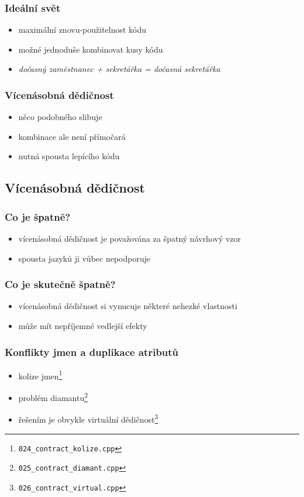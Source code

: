 	\begin{frame}
		\frametitle{Ideální svět}
		\begin{itemize}
			\item{maximální znovu-použitelnost kódu}
			\item{možné jednoduše kombinovat kusy kódu}
			\item{\textit{dočasný zaměstnanec + sekretářka = dočasná sekretářka}}
		\end{itemize}
	\end{frame}

	\begin{frame}
		\frametitle{Vícenásobná dědičnost}
		\begin{itemize}
			\item{něco podobného slibuje}
			\item{kombinace ale není přímočará}
			\item{nutná spousta lepícího kódu}
		\end{itemize}
	\end{frame}

	\subsection{Vícenásobná dědičnost}

	\begin{frame}
		\frametitle{Co je špatně?}
		\begin{itemize}
			\item{vícenásobná dědičnost je považována za špatný návrhový vzor}
			\item{spousta jazyků ji vůbec nepodporuje}
		\end{itemize}
	\end{frame}

	\begin{frame}
		\frametitle{Co je \textbf{skutečně} špatně?}
		\begin{itemize}
			\item{vícenásobná dědičnost si vynucuje některé nehezké vlastnosti}
			\item{může mít nepříjemné vedlejší efekty}
		\end{itemize}
	\end{frame}

	\begin{frame}
		\frametitle{Konflikty jmen a duplikace atributů}
		\begin{itemize}
			\item{kolize jmen\footnote{\texttt{024\_contract\_kolize.cpp}}}
			\item{problém diamantu\footnote{\texttt{025\_contract\_diamant.cpp}}}
			\item{řešením je obvykle virtuální dědičnost\footnote{\texttt{026\_contract\_virtual.cpp}}}
		\end{itemize}
	\end{frame}

